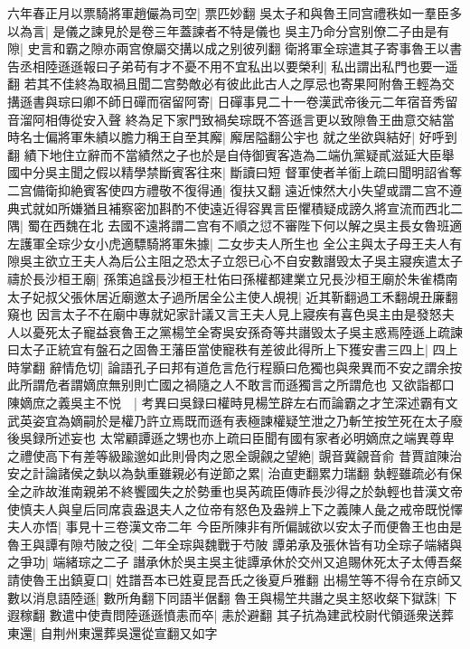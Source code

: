 六年春正月以票騎將軍趙儼為司空|{
	票匹妙翻}
吳太子和與魯王同宫禮秩如一羣臣多以為言|{
	是儀之諫見於是卷三年蓋諫者不特是儀也}
吳主乃命分宫别僚二子由是有隙|{
	史言和霸之隙亦兩宫僚屬交搆以成之别彼列翻}
衛將軍全琮遣其子寄事魯王以書告丞相陸遜遜報曰子弟苟有才不憂不用不宜私出以要榮利|{
	私出謂出私門也要一遥翻}
若其不佳終為取禍且聞二宫勢敵必有彼此此古人之厚忌也寄果阿附魯王輕為交搆遜書與琮曰卿不師日磾而宿留阿寄|{
	日磾事見二十一卷漢武帝後元二年宿音秀留音溜阿相傳從安入聲}
終為足下家門致禍矣琮既不答遜言更以致隙魯王曲意交結當時名士偏將軍朱績以膽力稱王自至其廨|{
	廨居隘翻公宇也}
就之坐欲與結好|{
	好呼到翻}
績下地住立辭而不當績然之子也於是自侍御賓客造為二端仇黨疑貳滋延大臣舉國中分吳主聞之假以精學禁斷賓客往來|{
	斷讀曰短}
督軍使者羊衜上疏曰聞明詔省奪二宫備衛抑絶賓客使四方禮敬不復得通|{
	復扶又翻}
遠近悚然大小失望或謂二宫不遵典式就如所嫌猶且補察密加斟酌不使遠近得容異言臣懼積疑成謗久將宣流而西北二隅|{
	蜀在西魏在北}
去國不遠將謂二宫有不順之愆不審陛下何以解之吳主長女魯班適左護軍全琮少女小虎適驃騎將軍朱據|{
	二女步夫人所生也}
全公主與太子母王夫人有隙吳主欲立王夫人為后公主阻之恐太子立怨已心不自安數譖毁太子吳主寢疾遣太子禱於長沙桓王廟|{
	孫策追諡長沙桓王杜佑曰孫權都建業立兄長沙桓王廟於朱雀橋南}
太子妃叔父張休居近廟邀太子過所居全公主使人覘視|{
	近其靳翻過工禾翻覘丑廉翻窺也}
因言太子不在廟中專就妃家計議又言王夫人見上寢疾有喜色吳主由是發怒夫人以憂死太子寵益衰魯王之黨楊笁全寄吳安孫奇等共譖毁太子吳主惑焉陸遜上疏諫曰太子正統宜有盤石之固魯王藩臣當使寵秩有差彼此得所上下獲安書三四上|{
	四上時掌翻}
辭情危切|{
	論語孔子曰邦有道危言危行程顥曰危獨也與衆異而不安之謂余按此所謂危者謂嫡庶無别則亡國之禍隨之人不敢言而遜獨言之所謂危也}
又欲詣都口陳嫡庶之義吳主不悦　|{
	考異曰吳録曰權時見楊笁辟左右而論霸之才笁深述霸有文武英姿宜為嫡嗣於是權乃許立焉既而遜有表極諫權疑笁泄之乃斬笁按笁死在太子廢後吳録所述妄也}
太常顧譚遜之甥也亦上疏曰臣聞有國有家者必明嫡庶之端異尊卑之禮使高下有差等級踰邈如此則骨肉之恩全覬覦之望絶|{
	覬音冀覦音俞}
昔賈誼陳治安之計論諸侯之埶以為埶重雖親必有逆節之累|{
	治直吏翻累力瑞翻}
埶輕雖疏必有保全之祚故淮南親弟不終饗國失之於勢重也吳芮疏臣傳祚長沙得之於埶輕也昔漢文帝使慎夫人與皇后同席袁盎退夫人之位帝有怒色及盎辨上下之義陳人彘之戒帝既悦懌夫人亦悟|{
	事見十三卷漢文帝二年}
今臣所陳非有所偏誠欲以安太子而便魯王也由是魯王與譚有隙芍陂之役|{
	二年全琮與魏戰于芍陂}
譚弟承及張休皆有功全琮子端緒與之爭功|{
	端緒琮之二子}
譖承休於吳主吳主徙譚承休於交州又追賜休死太子太傅吾粲請使魯王出鎮夏口|{
	姓譜吾本已姓夏昆吾氏之後夏戶雅翻}
出楊笁等不得令在京師又數以消息語陸遜|{
	數所角翻下同語半倨翻}
魯王與楊笁共譖之吳主怒收粲下獄誅|{
	下遐稼翻}
數遣中使責問陸遜遜憤恚而卒|{
	恚於避翻}
其子抗為建武校尉代領遜衆送葬東還|{
	自荆州東還葬吳還從宣翻又如字}
